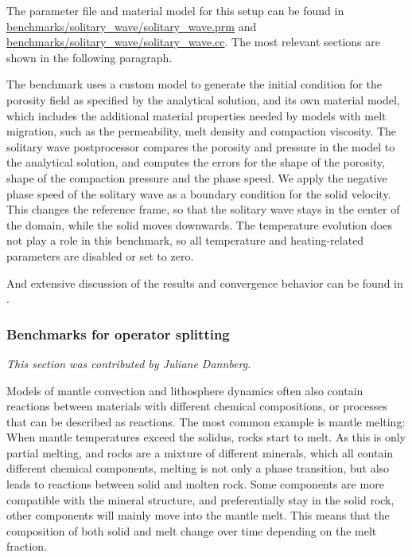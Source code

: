\documentclass{article}
\begin{document}
The parameter file and material model for this setup can be found in \url{benchmarks/solitary_wave/solitary_wave.prm} and \url{benchmarks/solitary_wave/solitary_wave.cc}. The most relevant sections are shown in the following paragraph. 



The benchmark uses a custom model to generate the initial condition for the porosity field as specified by the analytical solution, and its own material model, which includes the additional material properties needed by models with melt migration, such as the permeability, melt density and compaction viscosity. The solitary wave postprocessor compares the porosity and pressure in the model to the analytical solution, and computes the errors for the shape of the porosity, shape of the compaction pressure and the phase speed. 
We apply the negative phase speed of the solitary wave as a boundary condition for the solid velocity. This changes the reference frame, so that the solitary wave stays in the center of the domain, while the solid moves downwards. The temperature evolution does not play a role in this benchmark, so all temperature and heating-related parameters are disabled or set to zero. 

And extensive discussion of the results and convergence behavior can be found in \cite{dannberg_melt}.

\subsubsection{Benchmarks for operator splitting}
\label{sec:benchmark-operator_splitting}

\textit{This section was contributed by Juliane Dannberg.}

Models of mantle convection and lithosphere dynamics often also contain reactions between materials with different chemical compositions, or processes that can be described as reactions. 
The most common example is mantle melting: When mantle temperatures exceed the solidus, rocks start to melt. As this is only partial melting, and rocks are a mixture of different minerals, which all contain different chemical components, melting is not only a phase transition, but also leads to reactions between solid and molten rock. Some components are more compatible with the mineral structure, and preferentially stay in the solid rock, other components will mainly move into the mantle melt. This means that the composition of both solid and melt change over time depending on the melt fraction. 
\end{document}
